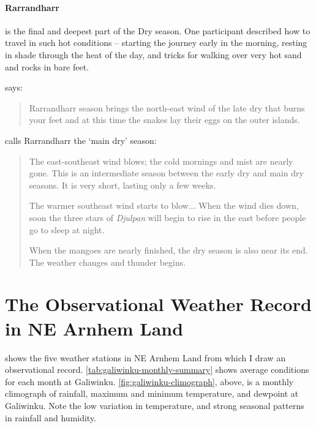 \paragraph{Rarrandharr} is the final and deepest part of the Dry season.
One participant described how to travel in such hot conditions -- starting
the journey early in the morning, resting in shade through the heat of the
day, and tricks for walking over very hot sand and rocks in bare feet.

\citet[][p36]{atlas2014} says: \blockquote{
    Rarrandharr season brings the north-east wind of the late dry that
    burns your feet and at this time the snakes lay their eggs on the
    outer islands.
}

\citet{davis1989} calls Rarrandharr the `main dry' season:
\blockquote{
    The east-southeast wind blows; the cold mornings and mist are nearly gone.
    This is an intermediate season between the early dry and main dry seasons.
    It is very short, lasting only a few weeks.

    The warmer southeast wind starts to blow...
    When the wind dies down, soon the three stars of \textit{Djulpan}
    will begin to rise in the east before people go to sleep at night.

    When the mangoes are nearly finished, the dry season is also near its end.
    The weather changes and thunder begins.
}




\section{The Observational Weather Record in NE Arnhem Land}



 shows the five weather stations in NE
Arnhem Land from which I draw an observational record.
\cref{tab:galiwinku-monthly-summary} shows average conditions for each
month at Galiwinku.  \cref{fig:galiwinku-climograph}, above, is a monthly
climograph of rainfall, maximum and minimum temperature, and dewpoint at
Galiwinku.  Note the low variation in temperature, and strong seasonal
patterns in rainfall and humidity.

~\\




